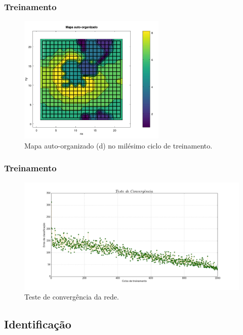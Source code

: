 \documentclass[10pt]{beamer} %
\begin{document}
\begin{frame}
	\frametitle{Treinamento}
	\begin{figure}
		\centering
		\includegraphics[width=7.0cm]{Imagens/SOM1000_2d.pdf}
		\caption{Mapa auto-organizado (d) no milésimo ciclo de treinamento.}
		\label{SOMd}
	\end{figure}
\end{frame}

\begin{frame}
	\frametitle{Treinamento}
	\begin{figure}[H]
		\centering
			\includegraphics[scale=0.23]{Imagens/conv070917.png}
		\caption{Teste de convergência da rede.}
		\label{convergencia}
	\end{figure} 
\end{frame}

\subsection{Identificação}
\end{document}
